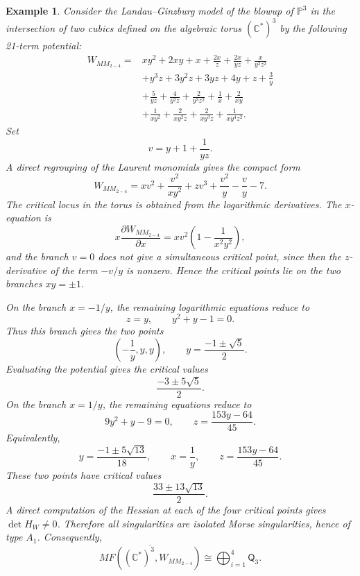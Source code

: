 \documentclass[11pt]{amsart}
\newtheorem{example}{Example}[section]
\newcommand{\MorseCat}[1]{\mathsf{Q}_{#1}}
\begin{document}
\begin{example}
Consider the Landau--Ginzburg model of the blowup of $\mathbb{P}^3$ in the intersection of two cubics defined on the algebraic torus $(\mathbb{C}^*)^3$ by the following 21-term potential:
$$\begin{aligned}
W_{MM_{2-4}} = {} & xy^2 + 2xy + x + \frac{2x}{z} + \frac{2x}{yz} + \frac{x}{y^2z^2} \\
& + y^3z + 3y^2z + 3yz + 4y + z + \frac{3}{y} \\
& + \frac{5}{yz} + \frac{4}{y^2z} + \frac{2}{y^3z^2}+ \frac{1}{x} + \frac{2}{xy}  \\
& + \frac{1}{xy^2} + \frac{2}{xy^2z} + \frac{2}{xy^3z} + \frac{1}{xy^4z^2}.
\end{aligned}$$
Set
\[
v=y+1+\frac{1}{yz}.
\]
A direct regrouping of the Laurent monomials gives the compact form
\[
W_{MM_{2-4}}=xv^2+\frac{v^2}{xy^2}+zv^3+\frac{v^2}{y}-\frac{v}{y}-7.
\]
The critical locus in the torus is obtained from the logarithmic derivatives. The $x$-equation is
\[
x\frac{\partial W_{MM_{2-4}}}{\partial x}=xv^2\left(1-\frac{1}{x^2y^2}\right),
\]
and the branch $v=0$ does not give a simultaneous critical point, since then the $z$-derivative of the term $-v/y$ is nonzero. Hence the critical points lie on the two branches $xy=\pm1$.

On the branch $x=-1/y$, the remaining logarithmic equations reduce to
\[
z=y,\qquad y^2+y-1=0.
\]
Thus this branch gives the two points
\[
\left(-\frac{1}{y},y,y\right),
\qquad
 y=\frac{-1\pm\sqrt{5}}{2}.
\]
Evaluating the potential gives the critical values
\[
\frac{-3\pm5\sqrt{5}}{2}.
\]
On the branch $x=1/y$, the remaining equations reduce to
\[
9y^2+y-9=0,
\qquad
z=\frac{153y-64}{45}.
\]
Equivalently,
\[
y=\frac{-1\pm5\sqrt{13}}{18},
\qquad
x=\frac{1}{y},
\qquad
z=\frac{153y-64}{45}.
\]
These two points have critical values
\[
\frac{33\pm13\sqrt{13}}{2}.
\]
A direct computation of the Hessian at each of the four critical points gives $\det H_W\neq0$. Therefore all singularities are isolated Morse singularities, hence of type $A_1$. Consequently,
\[
\overline{MF((\mathbb{C}^*)^3,W_{MM_{2-4}})}
\cong \bigoplus_{i=1}^{4}\MorseCat{3}.
\]
\end{example}
\end{document}
